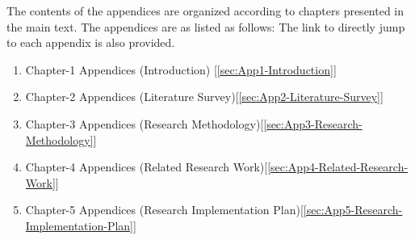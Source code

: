 
The contents of the appendices are organized according to chapters presented in the main text. The appendices are as listed as follows: The link to directly jump to each appendix is also provided.

\begin{enumerate}[start=1,label={(\bfseries \arabic*):}]
	\item Chapter-1 Appendices (Introduction) [\ref{sec:App1-Introduction}] 
	\item Chapter-2 Appendices (Literature Survey)[\ref{sec:App2-Literature-Survey}] 
	\item Chapter-3 Appendices (Research Methodology)[\ref{sec:App3-Research-Methodology}] 
	\item Chapter-4 Appendices (Related Research Work)[\ref{sec:App4-Related-Research-Work}] 
	\item Chapter-5 Appendices (Research Implementation Plan)[\ref{sec:App5-Research-Implementation-Plan}] 
\end{enumerate}

\clearpage
\pagebreak

